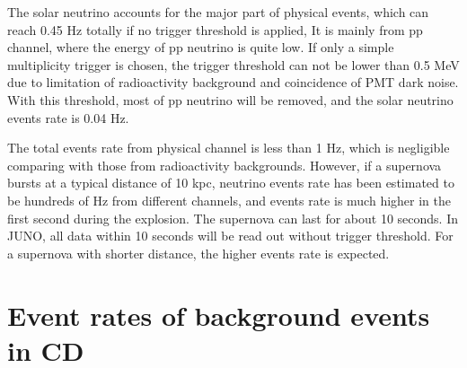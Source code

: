 \documentclass[a4paper,10pt,twoside]{paper}
\begin{document}
\begin{multicols}{2}
                
                The solar neutrino accounts for the major part of physical events, which can reach 0.45 Hz totally if no trigger threshold is applied, It is mainly from pp channel,
                where the energy of pp neutrino is quite low. If only a simple multiplicity trigger is chosen, the trigger threshold can not be lower than 0.5 MeV 
                due to limitation of radioactivity background and coincidence of PMT dark noise. With this threshold, most of pp neutrino will be removed, and the solar neutrino events rate is 0.04 Hz.

                The total events rate from physical channel is less than 1 Hz, which is negligible comparing with those from radioactivity backgrounds.
                However, if a supernova bursts at a typical distance of 10 kpc, neutrino events rate has been estimated to be hundreds of Hz from different channels, 
                and events rate is much higher in the first second during the explosion. The supernova can last for about 10 seconds. 
                In JUNO, all data within 10 seconds will be read out without trigger threshold. For a supernova with shorter distance, the higher events rate is expected. 
                
                
                \section{Event rates of background events in CD}

\end{multicols}
\end{document}
